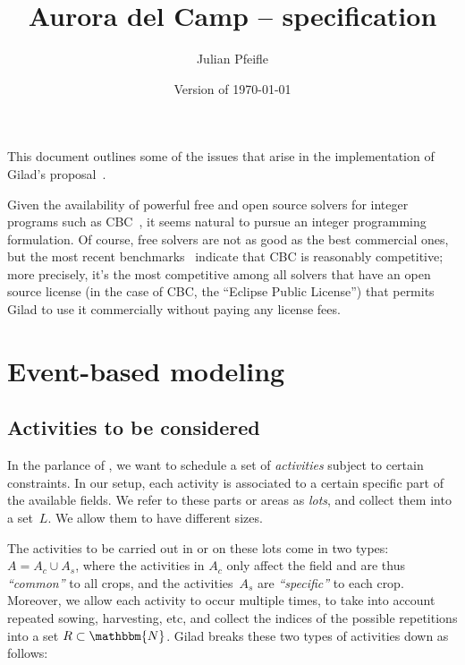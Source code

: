 \documentclass[11pt,reqno]{amsart}
\newcommand{\NN}{\mathbbm{N}}
\numberwithin{equation}{section}
\begin{document}
\renewcommand*\descriptionlabel[1]{%
\hspace\labelsep\normalfont\itshape #1:}

\newenvironment{mydesc}{%
  \begin{description}\setlength{\itemsep}{1ex}}%
  {\end{description}}

\title{Aurora del Camp -- specification}
\author{Julian Pfeifle}
\date{Version of \today}
\maketitle

This document outlines some of the issues that arise in the
implementation of Gilad's proposal~\cite{buzi11}.

\medskip
Given the availability of powerful free and open source solvers for
integer programs such as CBC~\cite{cbc}, it seems natural to pursue an
integer programming formulation. Of course, free solvers are not as
good as the best commercial ones, but the most recent
benchmarks~\cite{mittelmann11} indicate that CBC is reasonably
competitive; more precisely, it's the most competitive among all
solvers that have an open source license (in the case of CBC, the
``Eclipse Public License'') that permits Gilad to use it commercially
without paying any license fees.

\section{Event-based modeling}


\subsection{Activities to be considered}

In the parlance of \cite{artigues-etal11}, we want to schedule a set
of \emph{activities} subject to certain constraints. In our setup,
each activity is associated to a certain specific part of the
available fields. We refer to these parts or areas as \emph{lots}, and
collect them into a set~$L$. We allow them to have different
sizes.

The activities to be carried out in or on these lots come in two types: $A=A_c\cup A_s$,
where the activities in $A_c$ only affect the field and are thus \emph{``common''} to all
crops, and the activities~$A_s$ are \emph{``specific''} to each crop. Moreover, we allow
each activity to occur multiple times, to take into account repeated sowing, harvesting,
etc, and collect the indices of the possible repetitions into a set $R\subset\NN$.  Gilad
breaks these two types of activities down as follows:
\end{document}
